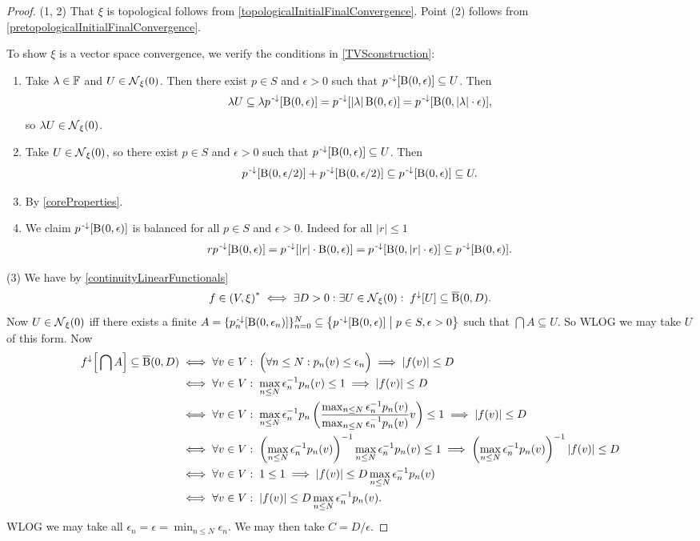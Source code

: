 \begin{proof}
(1, 2) That $\xi$ is topological follows from \ref{topologicalInitialFinalConvergence}. Point (2) follows from \ref{pretopologicalInitialFinalConvergence}.

To show $\xi$ is a vector space convergence, we verify the conditions in \ref{TVSconstruction}:
\begin{enumerate}
\item Take $\lambda\in \mathbb{F}$ and $U\in \operatorname{\mathcal{N}}_\xi(0)$. Then there exist $p\in S$ and $\epsilon > 0$ such that $p^{\text{\hspace{0.15em}-}\downarrow}[\operatorname{B}(0,\epsilon)] \subseteq U$. Then
\[ \lambda U \subseteq \lambda p^{\text{\hspace{0.15em}-}\downarrow}[\operatorname{B}(0,\epsilon)] = p^{\text{\hspace{0.15em}-}\downarrow}[|\lambda|\operatorname{B}(0,\epsilon)] = p^{\text{\hspace{0.15em}-}\downarrow}[\operatorname{B}(0,|\lambda|\cdot \epsilon)], \]
so $\lambda U\in \operatorname{\mathcal{N}}_\xi(0)$.
\item Take $U\in \operatorname{\mathcal{N}}_\xi(0)$, so there exist $p\in S$ and $\epsilon > 0$ such that $p^{\text{\hspace{0.15em}-}\downarrow}[\operatorname{B}(0,\epsilon)] \subseteq U$. Then
\[ p^{\text{\hspace{0.15em}-}\downarrow}[\operatorname{B}(0,\epsilon/2)] + p^{\text{\hspace{0.15em}-}\downarrow}[\operatorname{B}(0,\epsilon/2)] \subseteq p^{\text{\hspace{0.15em}-}\downarrow}[\operatorname{B}(0,\epsilon)] \subseteq U. \]
\item By \ref{coreProperties}.
\item We claim $p^{\text{\hspace{0.15em}-}\downarrow}[\operatorname{B}(0,\epsilon)]$ is balanced for all $p\in S$ and $\epsilon > 0$. Indeed for all $|r|\leq 1$
\[ rp^{\text{\hspace{0.15em}-}\downarrow}[\operatorname{B}(0,\epsilon)] = p^{\text{\hspace{0.15em}-}\downarrow}[|r|\cdot \operatorname{B}(0,\epsilon)] = p^{\text{\hspace{0.15em}-}\downarrow}[\operatorname{B}(0,|r|\cdot \epsilon)] \subseteq p^{\text{\hspace{0.15em}-}\downarrow}[\operatorname{B}(0,\epsilon)]. \]
\end{enumerate}

(3) We have by \ref{continuityLinearFunctionals}
\[ f\in \left( V, \xi \right)^* \iff \exists D>0: \exists U\in \operatorname{\mathcal{N}}_\xi(0):\; f^\downarrow[U] \subseteq \operatorname{\overline{B}}(0,D). \]
Now $U\in \operatorname{\mathcal{N}}_\xi(0)$ iff there exists a finite $A = \{p_n^{\text{\hspace{0.15em}-}\downarrow}[\operatorname{B}(0,\epsilon_n)]\}_{n=0}^N \subseteq \left\{ p^{\text{\hspace{0.15em}-}\downarrow}[\operatorname{B}(0,\epsilon)] \;\middle|\; p\in S, \epsilon > 0 \right\}$ such that $\bigcap A\subseteq U$. So WLOG we may take $U$ of this form.
Now 
\begin{align*}
f^\downarrow\Big[\bigcap A\Big] \subseteq \operatorname{\overline{B}}(0,D) &\iff \forall v\in V: \; \Big(\forall n\leq N: p_n(v)\leq \epsilon_n \Big) \implies |f(v)|\leq D \\
&\iff \forall v\in V: \; \max_{n\leq N}\epsilon_n^{-1}p_n(v)\leq 1 \implies |f(v)|\leq D \\
&\iff \forall v\in V: \; \max_{n\leq N}\epsilon_n^{-1}p_n\left(\frac{\max_{n\leq N}\epsilon_n^{-1}p_n(v)}{\max_{n\leq N}\epsilon_n^{-1}p_n(v)} v\right)\leq 1 \implies |f(v)|\leq D \\
&\iff \forall v\in V: \; \left(\max_{n\leq N}\epsilon_n^{-1}p_n(v)\right)^{-1}\max_{n\leq N}\epsilon_n^{-1}p_n(v)\leq 1 \implies \left(\max_{n\leq N}\epsilon_n^{-1}p_n(v)\right)^{-1}|f(v)|\leq D \\
&\iff \forall v\in V: \; 1\leq 1 \implies |f(v)|\leq D\max_{n\leq N}\epsilon_n^{-1}p_n(v) \\
&\iff \forall v\in V: \; |f(v)|\leq D\max_{n\leq N}\epsilon_n^{-1}p_n(v).
\end{align*}
WLOG we may take all $\epsilon_n = \epsilon = \min_{n\leq N}\epsilon_n$. We may then take $C = D/\epsilon$.
\end{proof}
